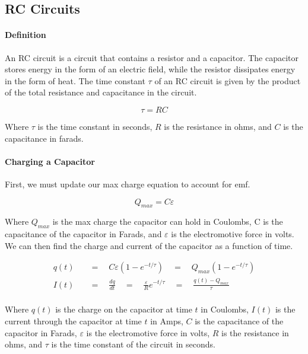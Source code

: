 \subsection{RC Circuits}
\hrulefill

\paragraph*{Definition}
An RC circuit is a circuit that contains a resistor and a capacitor. The capacitor stores energy in the form of an electric field, 
while the resistor dissipates energy in the form of heat. The time constant $\tau$ of an RC circuit is given by the product of the 
total resistance and capacitance in the circuit.

\begin{equation*}
    \tau = RC
\end{equation*}

Where $\tau$ is the time constant in seconds, $R$ is the resistance in ohms, and $C$ is the capacitance in farads. 

\paragraph*{Charging a Capacitor}
First, we must update our max charge equation to account for emf.

\begin{equation*}
    Q_{max} = C\varepsilon
\end{equation*}

Where $Q_{max}$ is the max charge the capacitor can hold in Coulombs, C is the capacitance of the capacitor in Farads, and $\varepsilon$
is the electromotive force in volts.\\

We can then find the charge and current of the capacitor as a function of time.

\begin{align*}
    q(t) \quad &= \quad C\varepsilon(1-e^{-t/\tau}) \quad = \quad Q_{max}(1-e^{-t/\tau})\\
    I(t) \quad &= \quad \frac{dq}{dt} \quad = \quad \frac{\varepsilon}{R}e^{-t/\tau} \quad = \quad \frac{q(t) - Q_{max}}{\tau}\\
\end{align*}

Where $q(t)$ is the charge on the capacitor at time $t$ in Coulombs, $I(t)$ is the current through the capacitor at time $t$ in Amps,
$C$ is the capacitance of the capacitor in Farads, $\varepsilon$ is the electromotive force in volts, $R$ is the resistance in ohms,
and $\tau$ is the time constant of the circuit in seconds.

